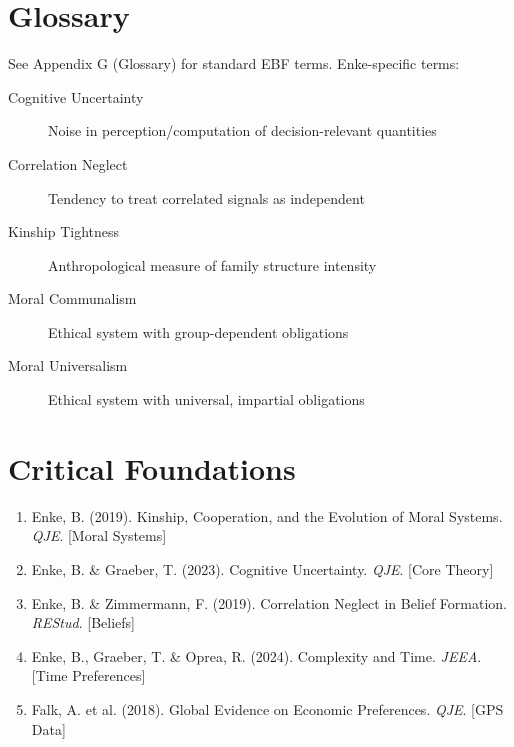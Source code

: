 \section{Glossary}

See Appendix G (Glossary) for standard EBF terms. Enke-specific terms:

\begin{description}
    \item[Cognitive Uncertainty] Noise in perception/computation of decision-relevant quantities
    \item[Correlation Neglect] Tendency to treat correlated signals as independent
    \item[Kinship Tightness] Anthropological measure of family structure intensity
    \item[Moral Communalism] Ethical system with group-dependent obligations
    \item[Moral Universalism] Ethical system with universal, impartial obligations
\end{description}

\section{Critical Foundations}

\begin{enumerate}
    \item Enke, B. (2019). Kinship, Cooperation, and the Evolution of Moral Systems. \textit{QJE}. [Moral Systems]
    \item Enke, B. \& Graeber, T. (2023). Cognitive Uncertainty. \textit{QJE}. [Core Theory]
    \item Enke, B. \& Zimmermann, F. (2019). Correlation Neglect in Belief Formation. \textit{REStud}. [Beliefs]
    \item Enke, B., Graeber, T. \& Oprea, R. (2024). Complexity and Time. \textit{JEEA}. [Time Preferences]
    \item Falk, A. et al. (2018). Global Evidence on Economic Preferences. \textit{QJE}. [GPS Data]
\end{enumerate}

